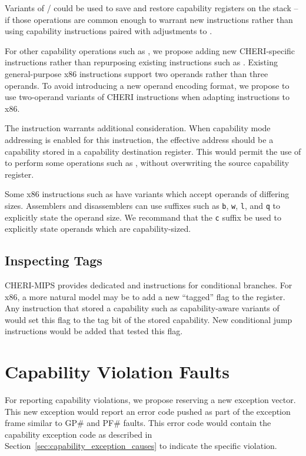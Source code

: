 Variants of / could be used to
save and restore capability registers on the stack -- if those operations
are common enough to warrant new instructions rather than using
capability  instructions paired with adjustments to
\CSP{}.

For other capability operations such as , we
propose adding new CHERI-specific instructions rather than
repurposing existing instructions such as .
Existing general-purpose x86 instructions support two operands rather
than three operands.  To avoid introducing a new operand encoding
format, we propose to use two-operand variants of CHERI
instructions when adapting instructions to x86.

The  instruction warrants additional consideration.
When capability mode addressing is enabled for this instruction, the
effective address should be a capability stored in a capability
destination register.  This would permit the use of 
to perform some operations such as , without
overwriting the source capability register.

Some x86 instructions such as  have variants
which accept operands of differing sizes.  Assemblers and
disassemblers can use suffixes such as \texttt{b}, \texttt{w},
\texttt{l}, and \texttt{q} to explicitly state the operand size.  We
recommand that the \texttt{c} suffix be used to explicitly state
operands which are capability-sized.

\subsection{Inspecting Tags}

CHERI-MIPS provides dedicated  and
 instructions for conditional branches.  For x86, a
more natural model may be to add a new ``tagged'' flag to the
\RFLAGS{} register.  Any instruction that stored a capability such as
capability-aware variants of  would set this
flag to the tag bit of the stored capability.  New conditional jump
instructions would be added that tested this flag.

\section{Capability Violation Faults}

For reporting capability violations, we propose reserving a new
exception vector.  This new exception would report an error code
pushed as part of the exception frame similar to GP\# and PF\# faults.
This error code would contain the capability exception code as
described in Section~\ref{sec:capability_exception_causes} to indicate
the specific violation.

